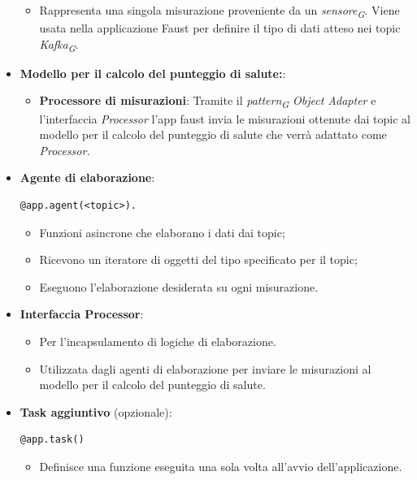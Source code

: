 \begin{itemize}
\begin{itemize}
        \item Rappresenta una singola misurazione proveniente da un \textit{sensore}\textsubscript{\textit{G}}. Viene usata nella applicazione Faust per definire il tipo di dati atteso nei topic \textit{Kafka}\textsubscript{\textit{G}}.
    \end{itemize}
    \item \textbf{Modello per il calcolo del punteggio di salute:}:
    \begin{itemize}
        \item \textbf{Processore di misurazioni}: 
        Tramite il \textit{pattern}\textsubscript{\textit{G}} \textit{Object Adapter} e l'interfaccia \textit{Processor} l'app faust invia le misurazioni ottenute dai topic al modello per il calcolo del punteggio di salute che verrà adattato come \textit{Processor.}
    \end{itemize}
    \item \textbf{Agente di elaborazione}: 
    \begin{lstlisting}[style=code]
        @app.agent(<topic>).
    \end{lstlisting}  
    \begin{itemize}
        \item Funzioni asincrone che elaborano i dati dai topic;
        \item Ricevono un iteratore di oggetti del tipo specificato per il topic;
        \item Eseguono l'elaborazione desiderata su ogni misurazione.
    \end{itemize}
    \item \textbf{Interfaccia Processor}:
    \begin{itemize}
        \item Per l'incapsulamento di logiche di elaborazione.
        \item Utilizzata dagli agenti di elaborazione per inviare le misurazioni al modello per il calcolo del punteggio di salute.
    \end{itemize}
    \item \textbf{Task aggiuntivo} (opzionale): 
    \begin{lstlisting}[style=code]
    @app.task()
        \end{lstlisting}  
    \begin{itemize}
        \item Definisce una funzione eseguita una sola volta all'avvio dell'applicazione.
    \end{itemize}
\end{itemize}


